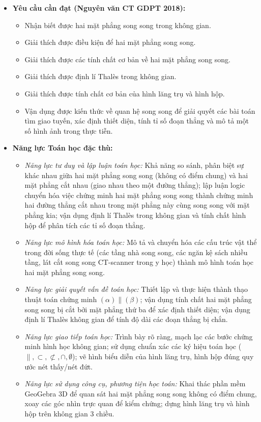 \documentclass[12pt, a4paper]{article}
\begin{document}
\begin{itemize}[leftmargin=1.2cm]
    \item \textbf{Yêu cầu cần đạt (Nguyên văn CT GDPT 2018):}
    \begin{itemize}[leftmargin=0.6cm]
        \item Nhận biết được hai mặt phẳng song song trong không gian.
        \item Giải thích được điều kiện để hai mặt phẳng song song.
        \item Giải thích được các tính chất cơ bản về hai mặt phẳng song song.
        \item Giải thích được định lí Thalès trong không gian.
        \item Giải thích được tính chất cơ bản của hình lăng trụ và hình hộp.
        \item Vận dụng được kiến thức về quan hệ song song để giải quyết các bài toán tìm giao tuyến, xác định thiết diện, tính tỉ số đoạn thẳng và mô tả một số hình ảnh trong thực tiễn.
    \end{itemize}

    \item \textbf{Năng lực Toán học đặc thù:}
    \begin{itemize}[leftmargin=0.6cm]
        \item \textit{Năng lực tư duy và lập luận toán học:} Khả năng so sánh, phân biệt sự khác nhau giữa hai mặt phẳng song song (không có điểm chung) và hai mặt phẳng cắt nhau (giao nhau theo một đường thẳng); lập luận logic chuyển hóa việc chứng minh hai mặt phẳng song song thành chứng minh hai đường thẳng cắt nhau trong mặt phẳng này cùng song song với mặt phẳng kia; vận dụng định lí Thalès trong không gian và tính chất hình hộp để phân tích các tỉ số đoạn thẳng.
        \item \textit{Năng lực mô hình hóa toán học:} Mô tả và chuyển hóa các cấu trúc vật thể trong đời sống thực tế (các tầng nhà song song, các ngăn kệ sách nhiều tầng, lát cắt song song CT-scanner trong y học) thành mô hình toán học hai mặt phẳng song song.
        \item \textit{Năng lực giải quyết vấn đề toán học:} Thiết lập và thực hiện thành thạo thuật toán chứng minh $(\alpha) \parallel (\beta)$; vận dụng tính chất hai mặt phẳng song song bị cắt bởi mặt phẳng thứ ba để xác định thiết diện; vận dụng định lí Thalès không gian để tính độ dài các đoạn thẳng bị chắn.
        \item \textit{Năng lực giao tiếp toán học:} Trình bày rõ ràng, mạch lạc các bước chứng minh hình học không gian; sử dụng chuẩn xác các ký hiệu toán học ($\parallel, \subset, \not\subset, \cap, \emptyset$); vẽ hình biểu diễn của hình lăng trụ, hình hộp đúng quy ước nét thấy/nét đứt.
        \item \textit{Năng lực sử dụng công cụ, phương tiện học toán:} Khai thác phần mềm GeoGebra 3D để quan sát hai mặt phẳng song song không có điểm chung, xoay các góc nhìn trực quan để kiểm chứng; dựng hình lăng trụ và hình hộp trên không gian 3 chiều.
    \end{itemize}


\end{itemize}
\end{document}
